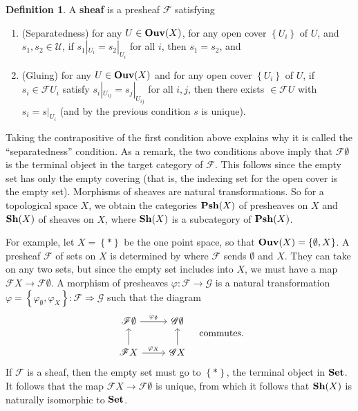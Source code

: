 \documentclass[11pt,leqno]{article}
\theoremstyle{plain}
\theoremstyle{definition}
\newtheorem{definition/}[lem]{Definition}
\newenvironment{definition}
  {\renewcommand{\qedsymbol}{\textdagger}%
   \pushQED{\qed}\begin{definition/}}
  {\popQED\end{definition/}}
\numberwithin{equation}{section}
\numberwithin{lem}{section}
\newcommand{\cbr}[1]{\left\{#1\right\}}
\newcommand{\bidx}[1]{\textbf{#1\index{#1}}} %
\newcommand{\catname}[1]{{\normalfont\mathbf{#1}}}
\newcommand{\Set}{\catname{Set}}
\newcommand{\Ouv}{\catname{Ouv}}
\newcommand{\Psh}{\catname{Psh}}
\newcommand{\Sh}{\catname{Sh}}
\begin{document}
\begin{definition}
    A \bidx{sheaf} is a presheaf $\mathscr F$ satisfying
    \begin{enumerate}
        \item (Separatedness) for any $U\in \Ouv(X)$, for any open cover $\cbr{U_i}$ of $U$, and $s_1,s_2\in \mathscr U$, if $s_1|_{U_i} =s_2|_{U_i}$ for all $i$, then $s_1 = s_2$, and
        \item (Gluing) for any $U\in\Ouv(X)$ and for any open cover $\cbr{U_i}$ of $U$, if $s_i\in \mathscr FU_i$ satisfy $s_i|_{U_{ij}} = s_j|_{U_{ij}}$ for all $i,j$, then there exists $\in \mathscr FU$ with $s_i = s|_{U_i}$ (and by the previous condition $s$ is unique). \qedhere
    \end{enumerate}
\end{definition}
Taking the contrapositive of the first condition above explains why it is called the ``separatedness'' condition.
As a remark, the two conditions above imply that $\mathscr F\emptyset$ is the terminal object in the target category of $\mathscr F$. This follows since the empty set has only the empty covering (that is, the indexing set for the open cover is the empty set).
Morphisms of sheaves are natural transformations. So for a topological space $X$, we obtain the categories $\Psh(X)$ of presheaves on $X$ and $\Sh(X)$ of sheaves on $X$, where $\Sh(X)$ is a subcategory of $\Psh(X)$.

For example, let $X = \cbr{\ast}$ be the one point space, so that $\Ouv(X) = \cbr{\emptyset, X}$. A presheaf $\mathscr F$ of sets on $X$ is determined by where $\mathscr F$ sends $\emptyset$ and $X$. They can take on any two sets, but since the empty set includes into $X$, we must have a map $\mathscr FX\to\mathscr F\emptyset$. A morphism of presheaves $\varphi\colon\mathscr F\to\mathscr G$ is a natural transformation $\varphi = \cbr{\varphi_\emptyset, \varphi_X}\colon \mathscr F\Rightarrow \mathscr G$ such that the diagram 
\begin{equation}
  \begin{tikzcd}[ampersand replacement=\&]
    {\mathscr F\emptyset} \& {\mathscr G\emptyset} \\
    {\mathscr FX} \& {\mathscr GX}
    \arrow["{\varphi_\emptyset}", from=1-1, to=1-2]
    \arrow[from=2-1, to=1-1]
    \arrow["{\varphi_X}", from=2-1, to=2-2]
    \arrow[from=2-2, to=1-2]
  \end{tikzcd} \quad\text{commutes.}
\end{equation}
If $\mathscr F$ is a sheaf, then the empty set must go to $\cbr{\ast}$, the terminal object in $\Set$. It follows that the map $\mathscr FX \to \mathscr F\emptyset$ is unique, from which it follows that $\Sh(X)$ is naturally isomorphic to $\Set$.
\end{document}
